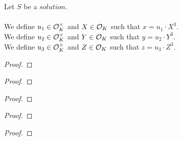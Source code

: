 \begin{definition}[$u_1,u_2,u_3,X,Y,Z$]
    \label{def:Solution_u1_u2_u3_X_Y_Z}
    \leanok
    Let $S$ be a $solution$.\\\\
    We define $u_1 \in \mathcal{O}^\times_K$ and $X \in \mathcal{O}_K$
    such that $x = u_1 \cdot X^3$.\\
    We define $u_2 \in \mathcal{O}^\times_K$ and $Y \in \mathcal{O}_K$
    such that $y = u_2 \cdot Y^3$.\\
    We define $u_3 \in \mathcal{O}^\times_K$ and $Z \in \mathcal{O}_K$
    such that $z = u_3 \cdot Z^3$.
\end{definition}

\begin{lemma}
    \label{lmm:X_ne_zero}
    \leanok
\end{lemma}
\begin{proof}
    \leanok
\end{proof}

\begin{lemma}
    \label{lmm:lambda_not_dvd_X}
    \leanok
\end{lemma}
\begin{proof}
    \leanok
\end{proof}

\begin{lemma}
    \label{lmm:lambda_not_dvd_Y}
    \leanok
\end{lemma}
\begin{proof}
    \leanok
\end{proof}

\begin{lemma}
    \label{lmm:lambda_not_dvd_Z}
    \leanok
\end{lemma}
\begin{proof}
    \leanok
\end{proof}

\begin{lemma}
    \label{lmm:coprime_Y_Z}
    \leanok
\end{lemma}
\begin{proof}
    \leanok
\end{proof}

